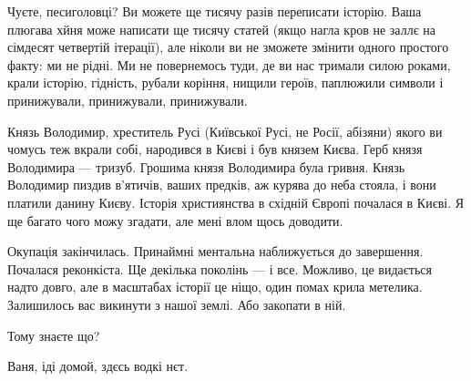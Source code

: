 Чуєте, песиголовці? Ви можете ще тисячу разів переписати історію. Ваша плюгава
хйня може написати ще тисячу статей (якщо нагла кров не заллє на сімдесят
четвертій ітерації), але ніколи ви не зможете змінити одного простого факту: ми
не рідні. Ми не повернемось туди, де ви нас тримали силою роками, крали
історію, гідність, рубали коріння, нищили героїв, паплюжили символи і
принижували, принижували, принижували.

Князь Володимир, хреститель Русі (Київської Русі, не Росії, абізяни) якого ви
чомусь теж вкрали собі, народився в Києві і був князем Києва. Герб князя
Володимира — тризуб. Грошима князя Володимира була гривня. Князь Володимир
пиздив в’ятичів, ваших предків, аж курява до неба стояла, і вони платили данину
Києву. Історія християнства в східній Європі почалася в Києві. Я ще багато чого
можу згадати, але мені влом щось доводити. 

Окупація закінчилась. Принаймні ментальна наближується до завершення. Почалася
реконкіста. Ще декілька поколінь — і все. Можливо, це видається надто довго,
але в масштабах історії це ніщо, один помах крила метелика. Залишилось вас
викинути з нашої землі. Або закопати в ній.

Тому знаєте що? 

Ваня, іді домой, здєсь водкі нєт.

